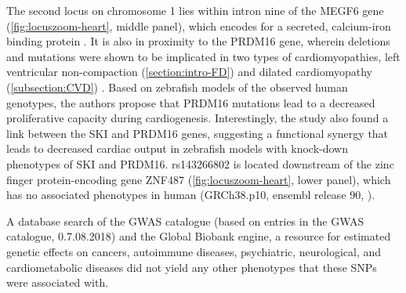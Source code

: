 The second locus on chromosome \num{1} lies within intron nine of the MEGF6 gene (\cref{fig:locuszoom-heart}, middle panel), which encodes for a secreted, calcium-iron binding protein \citep{Nakayama1998}. It is also in proximity to the PRDM16 gene, wherein deletions and mutations were shown to be implicated in two types of cardiomyopathies, left ventricular non-compaction (\cref{section:intro-FD}) and dilated cardiomyopathy  (\cref{subsection:CVD}) \citep{Arndt2013}. Based on zebrafish models of the observed human genotypes, the authors propose that PRDM16 mutations lead to a decreased proliferative capacity during cardiogenesis. Interestingly, the study also found a link between the SKI and PRDM16 genes, suggesting a functional synergy that leads to decreased cardiac output in zebrafish models with knock-down phenotypes of SKI and PRDM16. rs143266802 is located downstream of the zinc finger protein-encoding gene ZNF487 (\cref{fig:locuszoom-heart}, lower panel), which has no associated phenotypes in human (GRCh38.p10,  ensembl release 90, \citep{Aken2016}).  

A database search of the GWAS catalogue \citep{MacArthur2017} (based on entries in the GWAS catalogue, 0.7.08.2018) and the Global Biobank engine, a resource for estimated genetic effects on cancers, autoimmune diseases, psychiatric, neurological, and cardiometabolic diseases \citep{GBE2017} did not yield any other phenotypes that these SNPs were associated with.


